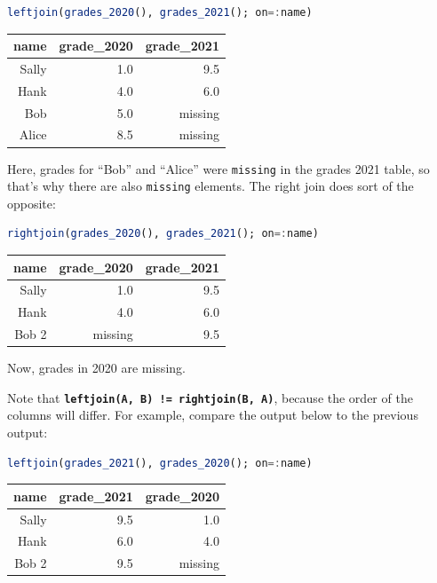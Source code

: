 \documentclass[
  notoc %
]{tufte-book}
\newcommand{\passthrough}[1]{#1}
\begin{document}
\begin{lstlisting}[language=Julia]
leftjoin(grades_2020(), grades_2021(); on=:name)
\end{lstlisting}

\begin{longtable}[]{@{}rrr@{}}
\toprule
name & grade\_2020 & grade\_2021 \\
\midrule
\endhead
Sally & 1.0 & 9.5 \\
Hank & 4.0 & 6.0 \\
Bob & 5.0 & missing \\
Alice & 8.5 & missing \\
\bottomrule
\end{longtable}

Here, grades for ``Bob'' and ``Alice'' were
\passthrough{\lstinline!missing!} in the grades 2021 table, so that's
why there are also \passthrough{\lstinline!missing!} elements. The right
join does sort of the opposite:

\begin{lstlisting}[language=Julia]
rightjoin(grades_2020(), grades_2021(); on=:name)
\end{lstlisting}

\begin{longtable}[]{@{}rrr@{}}
\toprule
name & grade\_2020 & grade\_2021 \\
\midrule
\endhead
Sally & 1.0 & 9.5 \\
Hank & 4.0 & 6.0 \\
Bob 2 & missing & 9.5 \\
\bottomrule
\end{longtable}

Now, grades in 2020 are missing.

Note that
\textbf{\passthrough{\lstinline"leftjoin(A, B) != rightjoin(B, A)"}},
because the order of the columns will differ. For example, compare the
output below to the previous output:

\begin{lstlisting}[language=Julia]
leftjoin(grades_2021(), grades_2020(); on=:name)
\end{lstlisting}

\begin{longtable}[]{@{}rrr@{}}
\toprule
name & grade\_2021 & grade\_2020 \\
\midrule
\endhead
Sally & 9.5 & 1.0 \\
Hank & 6.0 & 4.0 \\
Bob 2 & 9.5 & missing \\
\bottomrule
\end{longtable}
\end{document}
